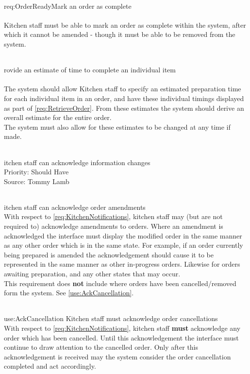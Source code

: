 \documentclass[11pt, a4paper]{report}
\def\itempar#1\\{\item \textbf{#1}\\} %
\begin{document}
\begin{enumerate}[label=F-UR-\arabic*, series=functional]
\begin{enumerate}[label*=.\arabic*]
\itempar \label{req:OrderReady}Mark an order as complete\\
\underline{}\\
Kitchen staff must be able to mark an order as complete within the system, after which it cannot be amended - though it must be able to be removed from the system.

\itempar Provide an estimate of time to complete an individual item\\
\underline{}\\
The system should allow Kitchen staff to specify an estimated preparation time for each individual item in an order, and have these individual timings displayed as part of \autoref{req:RetrieveOrder}. From these estimates the system should derive an overall estimate for the entire order.\\
The system must also allow for these estimates to be changed at any time if made.

\end{enumerate}

\itempar Kitchen staff can acknowledge information changes\\
Priority: Should Have\\
Source: Tommy Lamb\\

\begin{enumerate}[label*=.\arabic*]

\itempar Kitchen staff can acknowledge order amendments\\
With respect to \autoref{req:KitchenNotifications}, kitchen staff may (but are not required to) acknowledge amendments to orders. Where an amendment is acknowledged the interface must display the modified order in the same manner as any other order which is in the same state. For example, if an order currently being prepared is amended the acknowledgement should cause it to be represented in the same manner as other in-progress orders. Likewise for orders awaiting preparation, and any other states that may occur.\\
This requirement does \textbf{not} include where orders have been cancelled/removed form the system. See \autoref{use:AckCancellation}.

\itempar \label{use:AckCancellation} Kitchen staff must acknowledge order cancellations\\
With respect to \autoref{req:KitchenNotifications}, kitchen staff \textbf{must} acknowledge any order which has been cancelled. Until this acknowledgement the interface must continue to draw attention to the cancelled order. Only after this acknowledgement is received may the system consider the order cancellation completed and act accordingly.


\end{enumerate}
\end{enumerate}
\end{document}
